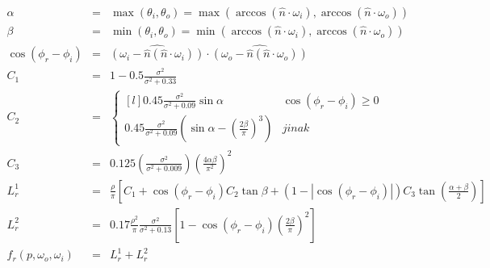 \documentclass[czech,master]{diploma}
\newcommand{\uvec}[1]{\hat{#1}}
\newcommand{\point}{p}
\newcommand{\brdf}{f_r\left(\point,\omega_{o},\omega_{i}\right)}
\newcommand{\normVec}{\uvec{n}}
\newcommand{\inVec}{\omega_{i}}
\newcommand{\outVec}{\omega_{o}}
\newcommand{\alb}{\rho}
\newcommand{\rough}{\sigma}
\begin{document}
\newcommand{\cosphiri}{\cos\left(\phi_r-\phi_i\right)}

\begin{eqnarray}
  \alpha & = & \max(\theta_i , \theta_o) = \max(\arccos(\normVec\cdot\inVec), \arccos(\normVec\cdot\outVec)) \nonumber \\
  \beta & = & \min(\theta_i , \theta_o) = \min(\arccos(\normVec\cdot\inVec), \arccos(\normVec\cdot\outVec)) \nonumber \\
  \cosphiri & = & \widehat{\left( \inVec - \normVec(\normVec\cdot\inVec) \right)} \cdot \widehat{\left( \outVec - \normVec(\normVec\cdot\outVec)  \right)} \nonumber \\
  C_1 & = & 1-0.5\frac{\rough^2}{\rough^2 + 0.33} \nonumber \\
  C_2 & = & \left\{\begin{matrix*}[l] 0.45\frac{\rough^2}{\rough^2+0.09}\sin\alpha & \cosphiri \geq 0\\ 0.45\frac{\rough^2}{\rough^2+0.09}\left(\sin\alpha-\left(\frac{2\beta}{\pi}\right)^3\right) & jinak \end{matrix*}\right. \nonumber \\
  C_3 & = & 0.125\left(\frac{\rough^2}{\rough^2 + 0.009}\right)\left(\frac{4\alpha\beta}{\pi^2}\right)^2 \nonumber \\
  L^{1}_{r} & = & \frac{\alb}{\pi}\left[C_1 + \cosphiri C_2\tan\beta + \left( 1-\left | \cosphiri  \right | \right)C_3\tan \left(\frac{\alpha+\beta}{2}\right)\right] \nonumber \\
  L^{2}_{r} & = & 0.17\frac{\alb^2}{\pi}\frac{\rough^2}{\rough^2+0.13}\left[1 - \cosphiri  \left(\frac{2\beta}{\pi}\right)^2 \right] \nonumber \\
  \brdf & = & L^{1}_{r} + L^{2}_{r} \label{eq:OrenNayar}
\end{eqnarray}

\clearpage
\end{document}
